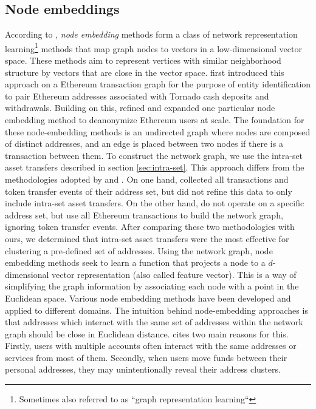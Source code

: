 \documentclass[12pt,a4paper,titlepage,oneside,english]{article}
\begin{document}
\subsection{Node embeddings}
\label{sec:node}

According to \cite{Beres2020}, \textit{node embedding} methods form a class of network representation learning\footnote{Sometimes also referred to as ``graph representation learning``} methods that map graph nodes to vectors in a low-dimensional vector space. These methods aim to represent vertices with similar neighborhood structure by vectors that are close in the vector space. \newline
\cite{Beres2020} first introduced this approach on a Ethereum transaction graph for the purpose of entity identification to pair Ethereum addresses associated with Tornado cash deposits and withdrawals. Building on this, \cite{wu2022tutela} refined and expanded one particular node embedding method to deanonymize Ethereum users at scale. \newline
The foundation for these node-embedding methods is an undirected graph where nodes are composed of distinct addresses, and an edge is placed between two nodes if there is a transaction between them. \newline
To construct the network graph, we use the intra-set asset transfers described in section \ref{sec:intra-set}. This approach differs from the methodologies adopted by \cite{Beres2020} and \cite{wu2022tutela}. On one hand, \cite{Beres2020} collected all transactions and token transfer events of their address set, but did not refine this data to only include intra-set asset transfers. On the other hand, \cite{wu2022tutela} do not operate on a specific address set, but use all Ethereum transactions to build the network graph, ignoring token transfer events. After comparing these two methodologies with ours, we determined that intra-set asset transfers were the most effective for clustering a pre-defined set of addresses. %
\newline
Using the network graph, node embedding methods seek to learn a function that projects a node to a $d$-dimensional vector representation (also called feature vector). This is a way of simplifying the graph information by associating each node with a point in the Euclidean space. Various node embedding methods have been developed and applied to different domains. \citep{rozemberczki2020difftovec} \newline
The intuition behind node-embedding approaches is that addresses which interact with the same set of addresses within the network graph should be close in Euclidean distance. \cite{Beres2020} cites two main reasons for this. Firstly, users with multiple accounts often interact with the same addresses or services from most of them. Secondly, when users move funds between their personal addresses, they may unintentionally reveal their address clusters. \newline
\end{document}
